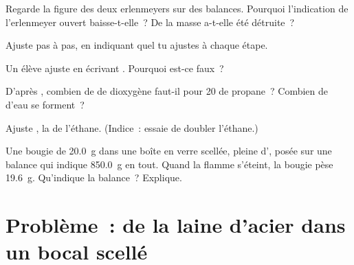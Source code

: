\begin{exercise}[$\star\star$]\label{exo:g8:balanced-equations:7}
Regarde la figure des deux erlenmeyers sur des balances. Pourquoi
l'indication de l'erlenmeyer ouvert baisse-t-elle~? De la masse a-t-elle
été détruite~?
\end{exercise}

\begin{exercise}[$\star\star$]\label{exo:g8:balanced-equations:8}
Ajuste  pas à pas, en indiquant quel  tu %
ajustes à chaque étape.
\end{exercise}

\begin{exercise}[$\star\star$]\label{exo:g8:balanced-equations:9}
Un élève ajuste  en écrivant . %
Pourquoi est-ce faux~?
\end{exercise}

\begin{exercise}[$\star\star$]\label{exo:g8:balanced-equations:10}
D'après , combien de  de
dioxygène faut-il pour  20  de propane~? Combien de
 d'eau se forment~?
\end{exercise}

\begin{exercise}[$\star\star\star$]\label{exo:g8:balanced-equations:11}
Ajuste , la  de l'éthane. (Indice~: %
essaie de doubler l'éthane.)
\end{exercise}

\begin{exercise}[$\star\star\star$]\label{exo:g8:balanced-equations:12}
Une bougie de \qty{20.0}{g}  dans une boîte en verre scellée,
pleine d', posée sur une balance qui indique \qty{850.0}{g} en tout.
Quand la flamme s'éteint, la bougie pèse \qty{19.6}{g}. Qu'indique la
balance~? Explique.
\end{exercise}

\section{Problème~: de la laine d'acier dans un bocal scellé}

